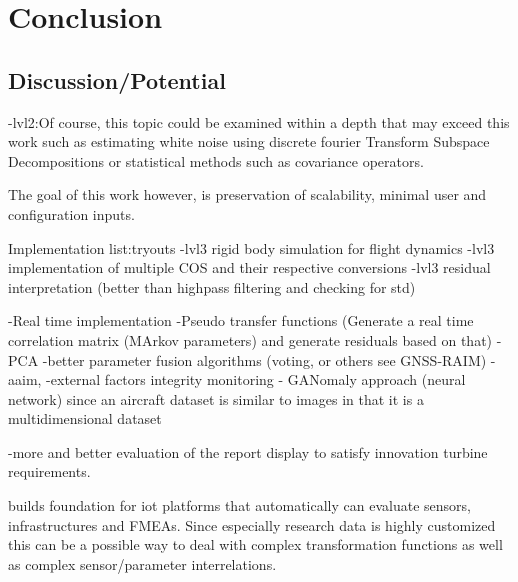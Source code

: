 \chapter{Conclusion}


\section{Discussion/Potential}

-lvl2:Of course, this topic could be examined within a depth that may exceed this work such as estimating white noise using discrete fourier Transform Subspace Decompositions \cite{hendriks_noise_2008} or statistical methods such as covariance operators.

The goal of this work however, is preservation of scalability, minimal user and configuration inputs.

Implementation list:tryouts
-lvl3 rigid body simulation for flight dynamics
-lvl3 implementation of multiple COS and their respective conversions
-lvl3 residual interpretation (better than highpass filtering and checking for std)

-Real time implementation
-Pseudo transfer functions (Generate a real time correlation matrix (MArkov parameters) and generate residuals based on that)
-PCA
-better parameter fusion algorithms (voting, or others see GNSS-RAIM)
        -aaim,
        -external factors integrity monitoring
- GANomaly approach (neural network) since an aircraft dataset is similar to images in that it is a multidimensional dataset

-more and better evaluation of the report display to satisfy innovation turbine requirements.


builds foundation for iot platforms that automatically can evaluate sensors, infrastructures and FMEAs. Since especially research data is highly customized this can be a possible way to deal with complex transformation functions as well as complex sensor/parameter interrelations.






